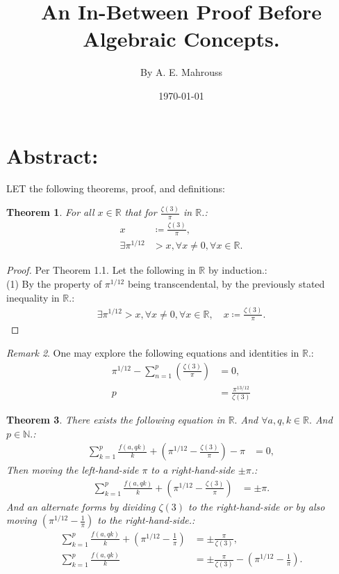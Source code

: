 \documentclass[10pt]{article}
\title{%
	\vspace{-1.5em}%
	\large\textbf{An In-Between Proof Before Algebraic Concepts.}%
}
\author{By A. E. Mahrouss}
\date{\today}
\theoremstyle{plain}
\newtheorem{theorem}{Theorem}[section]
\theoremstyle{definition}
\theoremstyle{remark}
\newtheorem{remark}[theorem]{Remark}
\begin{document}

\maketitle
\tableofcontents
\newpage

\section{Abstract:}

\lettrine[lines=1, lhang=0.1, loversize=0.2]{L}ET the following theorems, proof, and definitions:

\begin{theorem}
For all $x \in \mathbb{R}$ that for $\frac{\zeta(3)}{\pi}$ in $\mathbb{R}$.:
\begin{align*}
	x &\coloneq \frac{\zeta(3)}{\pi},\\
	\exists \pi^{1/12} &> x, \forall x \neq 0, \forall x \in \mathbb{R}.
\end{align*}
\end{theorem}
\begin{proof}
Per Theorem 1.1. Let the following in $\mathbb{R}$ by induction.:\\(1) By the property of $\pi^{1/12}$ being transcendental, by the previously stated inequality in $\mathbb{R}.$:
\begin{align*}
		\exists \pi^{1/12} > x, \forall x \neq 0, \forall x \in \mathbb{R}, \quad x \coloneq \frac{\zeta(3)}{\pi}.
\end{align*}
\end{proof}
\begin{remark}
	One may explore the following equations and identities in $\mathbb{R}.$:
	\begin{align*}
		\pi^{1/12} - \sum_{n=1}^{p}(\frac{\zeta(3)}{\pi}) &= 0,\\
		p &= \frac{\pi^{13/12}}{\zeta(3)}
	\end{align*}
\end{remark}
\begin{theorem}
There exists the following equation in $\mathbb{R}.$ And $\forall a, q, k \in \mathbb{R}.$ And $p \in \mathbb{N}.$:
\begin{align*}
	\sum_{k=1}^{p} \frac{f(a, qk)}{k} + (\pi^{1/12} - \frac{\zeta(3)}{\pi}) - \pi &= 0,
\end{align*}
Then moving the left-hand-side $\pi$ to a right-hand-side $\pm \pi$.:
\begin{align*}
	\sum_{k=1}^{p} \frac{f(a, qk)}{k} + (\pi^{1/12} - \frac{\zeta(3)}{\pi}) &= \pm \pi.
\end{align*}
And an alternate forms by dividing $\zeta(3)$ to the right-hand-side or by also moving $(\pi^{1/12} - \frac{1}{\pi})$ to the right-hand-side.:
\begin{align*}
	\sum_{k=1}^{p} \frac{f(a, qk)}{k} + (\pi^{1/12} - \frac{1}{\pi}) &= \pm \frac{\pi}{\zeta(3)},\\
	\sum_{k=1}^{p} \frac{f(a, qk)}{k} &= \pm \frac{\pi}{\zeta(3)} - (\pi^{1/12} - \frac{1}{\pi}) .
\end{align*}
\end{theorem}
\end{document}
